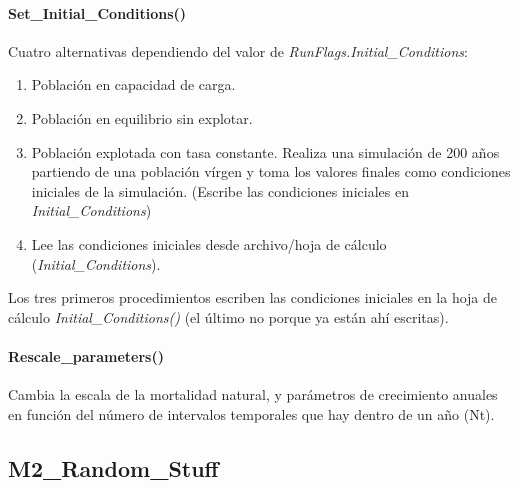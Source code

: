 			\paragraph{Set\_Initial\_Conditions()}
			Cuatro alternativas dependiendo del valor de \emph{RunFlags.Initial\_Conditions}: 
				\begin{enumerate}
					\item Población en capacidad de carga.
					\item Población en equilibrio sin explotar.
					\item Población explotada con tasa constante. Realiza una simulación de 200 años partiendo de una población vírgen y toma los valores finales como condiciones iniciales de la simulación. (Escribe las condiciones iniciales en \emph{Initial\_Conditions})
					\item Lee las condiciones iniciales desde archivo/hoja de cálculo (\emph{Initial\_Conditions}).
				\end{enumerate}
			Los tres primeros procedimientos escriben las condiciones iniciales en la hoja de cálculo \emph{Initial\_Conditions()} (el último no porque ya están ahí escritas).
				
			\paragraph{Rescale\_parameters()}
			Cambia la escala de la mortalidad natural, y parámetros de crecimiento anuales en función del número de intervalos temporales que hay dentro de un año (Nt).
		
			
			
		\subsection{M2\_Random\_Stuff}

